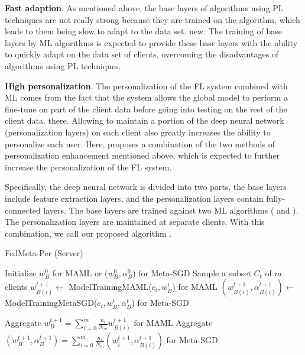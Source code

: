 \documentclass[runningheads]{llncs}
\begin{document}
\textbf{Fast adaption}. As mentioned above, the base layers of algorithms using PL techniques are not really strong because they are trained on the  algorithm, which leads to them being slow to adapt to the data set. new. The training of base layers by ML algorithms is expected to provide these base layers with the ability to quickly adapt on the data set of clients, overcoming the disadvantages of algorithms using PL techniques.

\textbf{High personalization}. The personalization of the FL system combined with ML comes from the fact that the system allows the global model to perform a fine-tune on part of the client data before going into testing on the rest of the client data. there. Allowing to maintain a portion of the deep neural network (personalization layers) on each client also greatly increases the ability to personalize each user. Here,  proposes a combination of the two methods of personalization enhancement mentioned above, which is expected to further increase the personalization of the FL system.

Specifically, the deep neural network is divided into two parts, the base layers include feature extraction layers, and the personalization layers contain fully-connected layers. The base layers are trained against two ML algorithms ( and ). The personalization layers are maintained at separate clients. With this combination, we call our proposed algorithm .

\begin{algorithm}[h]
    \caption{FedMeta-Per (Server)} \label{alg:fedmeta_per_server}
    \begin{algorithmic}[1]
        \State Initialize $w_B^0$ for MAML or ($w_B^0, \alpha_B^0$) for Meta-SGD
            \State Sample a subset $C_t$ of $m$ clients
                \State $w_{B(i)}^{t+1} \gets$ ModelTrainingMAML($c_i, w_B^t$) for MAML
                \State $(w_{B(i)}^{t+1}, \alpha_{B(i)}^{t+1}) \gets$ ModelTrainingMetaSGD($c_i, w_B^t, \alpha_B^t$) for Meta-SGD
            \EndFor

            \State
            \State Aggregate $w_{B}^{t+1} = \sum_{i=0}^m \frac{n_i}{N_m} w_{B(i)}^{t+1}$ for MAML
            \State Aggregate $(w_B^{t+1}, \alpha_B^{t+1}) = \sum_{i=0}^m \frac{n_i}{N_m} (w_i^{t+1}, \alpha_{B(i)}^{t+1})$ for Meta-SGD
        \EndFor
    \end{algorithmic}
\end{algorithm}
\end{document}
